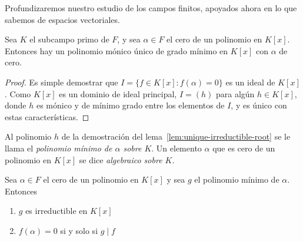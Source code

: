   Profundizaremos nuestro estudio de los campos finitos,
  apoyados ahora en lo que sabemos de espacios vectoriales.%
  \begin{lemma}
    \label{lem:unique-irreductible-root}
    Sea \(K\) el subcampo primo de \(F\),%
    y sea \(\alpha \in F\) el cero de un polinomio en \(K[x]\).
    Entonces hay un polinomio mónico%
    único de grado mínimo en \(K[x]\)
    con \(\alpha\) de cero.
  \end{lemma}
  \begin{proof}
    Es simple
    demostrar que \(I = \{f \in K[x] \colon f(\alpha) = 0\}\)
    es un ideal de \(K[x]\).
    Como \(K[x]\) es un dominio de ideal principal,%
    \(I = (h)\) para algún \(h \in K[x]\),
    donde \(h\) es mónico
    y de mínimo grado entre los elementos de \(I\),
    y es único con estas características.
  \end{proof}
  Al polinomio \(h\)
  de la demostración del lema~\ref{lem:unique-irreductible-root}
  se le llama el \emph{polinomio mínimo de \(\alpha\) sobre \(K\)}.%
  Un elemento \(\alpha\) que es cero de un polinomio en \(K[x]\)
  se dice \emph{algebraico sobre \(K\)}.
  \begin{theorem}
    \label{theo:minimal-polynomial-divides}
    Sea \(\alpha \in F\) el cero de un polinomio en \(K[x]\)
    y sea \(g\) el polinomio mínimo de \(\alpha\).
    Entonces
    \begin{enumerate}[label = (\roman*), ref = (\roman*)]
    \item
      \(g\) es irreductible en \(K[x]\)%
    \item
      \(f(\alpha) = 0\)
      si y solo si \(g \mid f\)
    \end{enumerate}
  \end{theorem}
